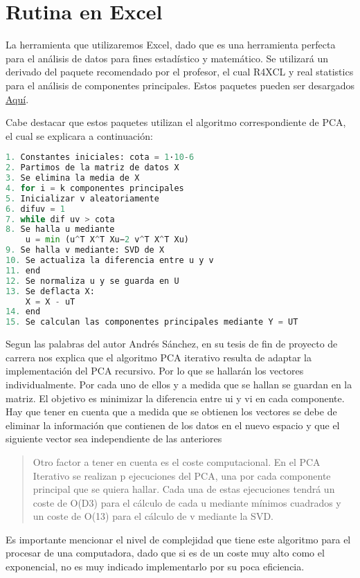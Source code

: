 \chapter{Rutina en Excel}
\label{ch:rutina}

La herramienta que utilizaremos Excel, dado que es una herramienta perfecta para el análisis de datos para fines estadístico y matemático. Se utilizará un derivado del paquete recomendado por el profesor, el cual R4XCL y real statistics para el análisis de componentes principales. Estos paquetes pueden ser desargados \href{www.http://cipadla.com/}{Aquí}.

Cabe destacar que estos paquetes utilizan el algoritmo correspondiente de PCA, el cual se explicara a continuación: 

\begin{lstlisting}[language=python, caption=Pseudocódigo PCA iterativo ,label={lst:algoritmoIte}]
1. Constantes iniciales: cota = 1·10-6
2. Partimos de la matriz de datos X
3. Se elimina la media de X
4. for i = k componentes principales
5. Inicializar v aleatoriamente
6. difuv = 1
7. while dif uv > cota
8. Se halla u mediante
    u = min (u^T X^T Xu−2 v^T X^T Xu)
9. Se halla v mediante: SVD de X
10. Se actualiza la diferencia entre u y v
11. end
12. Se normaliza u y se guarda en U
13. Se deflacta X: 
    X = X - uT
14. end
15. Se calculan las componentes principales mediante Y = UT

\end{lstlisting}


Segun las palabras del autor Andrés Sánchez, en su tesis de fin de proyecto de carrera nos explica que el algoritmo PCA iterativo resulta de adaptar la implementación del PCA recursivo. Por lo que se hallarán los vectores individualmente. Por cada uno de ellos y a medida que se hallan se guardan en la matriz. El objetivo es minimizar la diferencia entre ui y vi en cada
componente. Hay que tener en cuenta que a medida que se obtienen los vectores se debe de eliminar la
información que contienen de los datos en el nuevo espacio y que el siguiente vector sea independiente de las anteriores 

\begin{quote}
    Otro factor a tener en cuenta es el coste computacional. En el PCA Iterativo se realizan p ejecuciones del PCA, una por cada componente principal que se quiera hallar. Cada una de estas ejecuciones tendrá un coste de O(D3) para el cálculo de cada u mediante mínimos cuadrados y un coste de O(13) para el cálculo de v mediante la SVD. \cite{andresSanchesMangas}
\end{quote}

Es importante mencionar el nivel de complejidad que tiene este algoritmo para el procesar de una computadora, dado que si es de un coste muy alto como el exponencial, no es muy indicado implementarlo por su poca eficiencia. 


